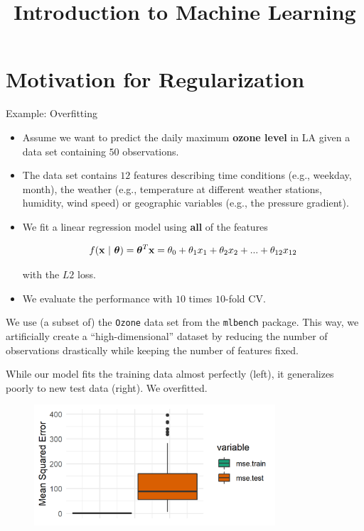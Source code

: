 \documentclass[11pt,compress,t,notes=noshow, xcolor=table]{beamer}
\title{Introduction to Machine Learning}
\date{}
\begin{document}

\section{Motivation for Regularization}


\begin{vbframe}{Example: Overfitting}

\begin{itemize}
\item Assume we want to predict the daily maximum \textbf{ozone level} in LA given a data set containing $50$ observations.
\item The data set contains $12$ features describing time conditions (e.g., weekday, month),
the weather (e.g., temperature at different weather stations, humidity, wind speed) or geographic variables (e.g., the pressure gradient).
\item We fit a linear regression model using \textbf{all} of the features

$$
f(\mathbf{x} ~|~ \bm{\theta}) = \bm{\theta}^T\mathbf{x} = \theta_0 + \theta_1 x_1 + \theta_2 x_2 + ... + \theta_{12} x_{12}
$$

with the $L2$ loss.

\item We evaluate the performance with $10$ times $10$-fold CV.

\end{itemize}

\vfill

\begin{footnotesize} 
We use (a subset of) the \texttt{Ozone} data set from the \texttt{mlbench} package. This way, we artificially create a \enquote{high-dimensional} dataset by reducing the number of observations drastically while keeping the number of features fixed. 
\end{footnotesize}

\framebreak 


While our model fits the training data almost perfectly (left), it generalizes poorly
to new test data (right). We overfitted.

\lz 

\begin{figure}
\includegraphics[width=0.8\textwidth]{figure/ozone_mse_boxplot.png}\\
\end{figure}

\end{vbframe}
\end{document}

